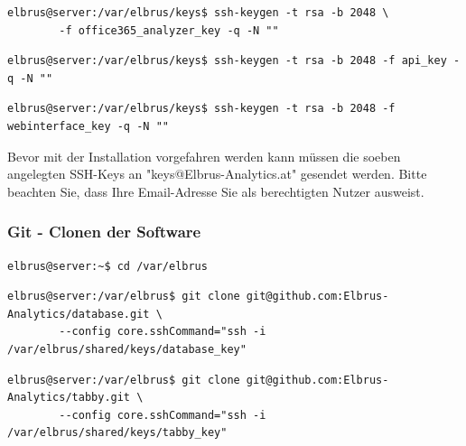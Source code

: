 \documentclass{article}
\begin{document}
	\lstset{style=commands}
	\begin{lstlisting}[caption={Erstellen des SSH-keys der für das Herunterladen des 'office365 analyzers' benötigt wird.}]
		elbrus@server:/var/elbrus/keys$ ssh-keygen -t rsa -b 2048 \
		-f office365_analyzer_key -q -N ""
	\end{lstlisting}
	
	\lstset{style=commands}
	\begin{lstlisting}[caption={Erstellen des SSH-keys der für das Herunterladen der 'API' benötigt wird.}]
		elbrus@server:/var/elbrus/keys$ ssh-keygen -t rsa -b 2048 -f api_key -q -N ""
	\end{lstlisting}
	
	\lstset{style=commands}
	\begin{lstlisting}[caption={Erstellen des SSH-keys der für das Herunterladen des 'Webinterfaces' benötigt wird.}]
		elbrus@server:/var/elbrus/keys$ ssh-keygen -t rsa -b 2048 -f webinterface_key -q -N ""
	\end{lstlisting}

	Bevor mit der Installation vorgefahren werden kann müssen die soeben angelegten SSH-Keys an "keys@Elbrus-Analytics.at" gesendet werden. Bitte beachten Sie, dass Ihre Email-Adresse Sie als berechtigten Nutzer ausweist.
	
	\subsubsection{Git - Clonen der Software}

	\lstset{style=commands}
	\begin{lstlisting}[caption={Wechseln des Verzeichnisses.}]
		elbrus@server:~$ cd /var/elbrus
	\end{lstlisting}
	
	\lstset{style=commands}
	\begin{lstlisting}[caption={Clonen der Datenbank Software.}]
		elbrus@server:/var/elbrus$ git clone git@github.com:Elbrus-Analytics/database.git \
		--config core.sshCommand="ssh -i /var/elbrus/shared/keys/database_key"
	\end{lstlisting}

	\lstset{style=commands}
	\begin{lstlisting}[caption={Clonen der Kernsoftware 'tabby'.}]
		elbrus@server:/var/elbrus$ git clone git@github.com:Elbrus-Analytics/tabby.git \
		--config core.sshCommand="ssh -i /var/elbrus/shared/keys/tabby_key"
	\end{lstlisting}
	
\end{document}
